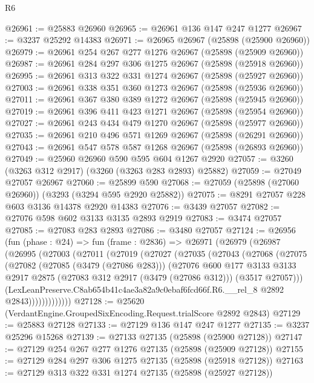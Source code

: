 \begin{lexlean}{R6}
\begin{coremodule}
@26961 := @25883 @26960
@26965 := @26961 @136 @147 @247 @1277
@26967 := @3237 @25292 @14383
@26971 := @26965 @26967 (@25898 (@25900 @26960))
@26979 := @26961 @254 @267 @277 @1276 @26967 (@25898 (@25909 @26960))
@26987 := @26961 @284 @297 @306 @1275 @26967 (@25898 (@25918 @26960))
@26995 := @26961 @313 @322 @331 @1274 @26967 (@25898 (@25927 @26960))
@27003 := @26961 @338 @351 @360 @1273 @26967 (@25898 (@25936 @26960))
@27011 := @26961 @367 @380 @389 @1272 @26967 (@25898 (@25945 @26960))
@27019 := @26961 @396 @411 @423 @1271 @26967 (@25898 (@25954 @26960))
@27027 := @26961 @243 @434 @479 @1270 @26967 (@25898 (@25977 @26960))
@27035 := @26961 @210 @496 @571 @1269 @26967 (@25898 (@26291 @26960))
@27043 := @26961 @547 @578 @587 @1268 @26967 (@25898 (@26893 @26960))
@27049 := @25960 @26960 @590 @595 @604 @1267 @2920
@27057 := @3260 (@3263 @312 @2917) (@3260 (@3263 @283 @2893) @25882)
@27059 := @27049 @27057 @26967
@27060 := @25899 @590
@27068 := @27059 (@25898 (@27060 @26960)) (@3293 (@3294 @595 @2920 @25882))
@27075 := @8291 @27057 @228 @603 @3136 @14378 @2920 @14383
@27076 := @3439 @27057
@27082 := @27076 @598 @602 @3133 @3135 @2893 @2919
@27083 := @3474 @27057
@27085 := @27083 @283 @2893
@27086 := @3480 @27057
@27124 := @26956
    (fun (phase : @24) =>
    fun (frame : @2836) =>
    @26971
      (@26979
        (@26987
          (@26995
            (@27003
              (@27011
                (@27019
                  (@27027
                    (@27035
                      (@27043
                        (@27068
                          (@27075
                            (@27082
                              (@27085 (@3479 (@27086 @283)))
                              (@27076
                                @600
                                @177
                                @3133
                                @3133
                                @2917
                                @2875
                                (@27083 @312 @2917 (@3479 (@27086 @312)))
                                (@3517 @27057)))
                            (LexLeanPreserve.C8ab654b41c4ae3a82a9c0ebaf6fcd66f.R6.__rel_8
                              @2892
                              @2843)))))))))))))
@27128 := @25620 (VerdantEngine.GroupedSixEncoding.Request.trialScore @2892 @2843)
@27129 := @25883 @27128
@27133 := @27129 @136 @147 @247 @1277
@27135 := @3237 @25296 @15268
@27139 := @27133 @27135 (@25898 (@25900 @27128))
@27147 := @27129 @254 @267 @277 @1276 @27135 (@25898 (@25909 @27128))
@27155 := @27129 @284 @297 @306 @1275 @27135 (@25898 (@25918 @27128))
@27163 := @27129 @313 @322 @331 @1274 @27135 (@25898 (@25927 @27128))

\end{coremodule}
\end{lexlean}
